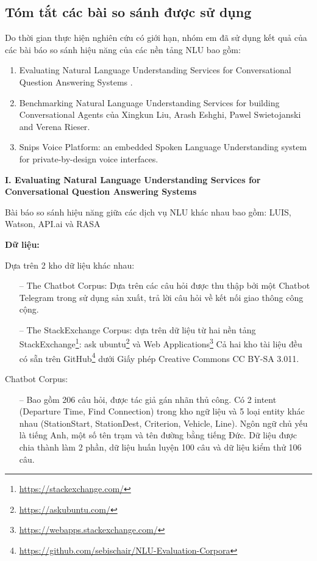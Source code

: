 \subsection{Tóm tắt các bài so sánh được sử dụng}

Do thời gian thực hiện nghiên cứu có giới hạn, nhóm em đã sử dụng kết quả của các bài báo so sánh hiệu năng của các nền tảng NLU bao gồm:

\begin{enumerate}
    \item Evaluating Natural Language Understanding Services for Conversational Question Answering Systems \cite{EvaluatingNLU}.
    \item Benchmarking Natural Language Understanding Services for building Conversational Agents của Xingkun Liu, Arash Eshghi, Pawel Swietojanski and Verena Rieser\cite{BenchmarkingNLU}.
    \item Snips Voice Platform: an embedded Spoken Language Understanding system for private-by-design voice interfaces\cite{snips-nlu}.
\end{enumerate}

\textbf{I. Evaluating Natural Language Understanding Services for Conversational Question Answering Systems}

Bài báo so sánh hiệu năng giữa các dịch vụ NLU khác nhau bao gồm: LUIS, Watson, API.ai và RASA

\textbf{Dữ liệu:}

Dựa trên 2 kho dữ liệu khác nhau:
\begin{itemize}
    \item[--] The Chatbot Corpus: Dựa trên các câu hỏi được thu thập bởi một Chatbot Telegram trong sử dụng sản xuất, trả lời câu hỏi về kết nối giao thông công cộng.
    \item[--] The StackExchange Corpus: dựa trên dữ liệu từ hai nền tảng StackExchange\footnote{\url{https://stackexchange.com/}}: ask ubuntu\footnote{\url{https://askubuntu.com/}} và Web Applications\footnote{\url{https://webapps.stackexchange.com/}} Cả hai kho tài liệu đều có sẵn trên GitHub\footnote{\url{https://github.com/sebischair/NLU-Evaluation-Corpora}}  dưới Giấy phép Creative Commons CC BY-SA 3.011.
\end{itemize}

Chatbot Corpus:

\begin{itemize}
    \item[--] Bao gồm 206 câu hỏi, được tác giả gán nhãn thủ công. Có 2 intent (Departure Time, Find Connection) trong kho ngữ liệu và 5 loại entity khác nhau (StationStart, StationDest, Criterion, Vehicle, Line). Ngôn ngữ chủ yếu là tiếng Anh, một số tên trạm và tên đường bằng tiếng Đức. Dữ liệu được chia thành làm 2 phần, dữ liệu huấn luyện 100 câu và dữ liệu kiểm thử 106 câu.
\end{itemize}




